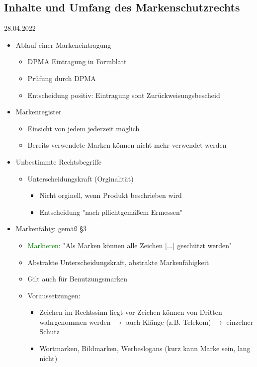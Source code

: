\documentclass{report}
\begin{document}
\subsection{Inhalte und Umfang des Markenschutzrechts}
28.04.2022
\begin{itemize}
	\item Ablauf einer Markeneintragung
	\begin{itemize}
		\item DPMA Eintragung in Formblatt
		\item Prüfung durch DPMA
		\item Entscheidung positiv: Eintragung
		\newline sont Zurückweisungsbescheid
	\end{itemize}
	\item Markenregister
	\begin{itemize}
		\item Einsicht von jedem jederzeit möglich
		\item Bereits verwendete Marken können nicht mehr verwendet werden
	\end{itemize}
	\item Unbestimmte Rechtsbegriffe
	\begin{itemize}
		\item Unterscheidungskraft (Orginalität)
		\begin{itemize}
			\item Nicht orginell, wenn Produkt beschrieben wird
			\item Entscheidung "nach pflichtgemäßem Ermessen"
		\end{itemize}
	\end{itemize}
	\item Markenfähig: gemäß §3
	\begin{itemize}
		\item \textcolor{green}{Markieren}: "Als Marken können alle Zeichen [...] geschützt werden"
		\item Abstrakte Unterscheidungskraft, abstrakte Markenfähigkeit
		\item Gilt auch für Benutzungsmarken
		\item Voraussetzungen:
		\begin{itemize}
			\item Zeichen im Rechtssinn liegt vor
			\newline Zeichen können von Dritten wahrgenommen werden $\rightarrow$ auch Klänge (z.B. Telekom) $\rightarrow$ einzelner Schutz
			\item Wortmarken, Bildmarken, Werbeslogans (kurz kann Marke sein, lang nicht)

\end{itemize}
\end{itemize}
\end{itemize}
\end{document}
